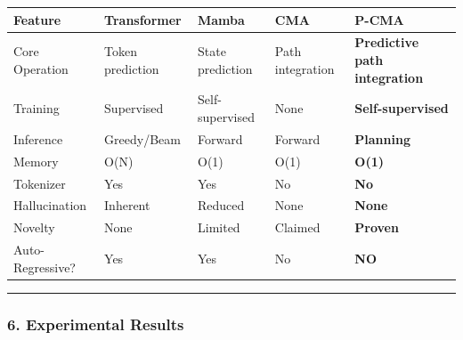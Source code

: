 \documentclass[
  11pt,
  a4paper,
]{article}
\begin{document}
\begin{longtable}[]{@{}
  >{\raggedright\arraybackslash}p{}
  >{\raggedright\arraybackslash}p{}
  >{\raggedright\arraybackslash}p{}
  >{\raggedright\arraybackslash}p{}
  >{\raggedright\arraybackslash}p{}@{}}
\toprule\noalign{}
\begin{minipage}[b]{\linewidth}\raggedright
Feature
\end{minipage} & \begin{minipage}[b]{\linewidth}\raggedright
Transformer
\end{minipage} & \begin{minipage}[b]{\linewidth}\raggedright
Mamba
\end{minipage} & \begin{minipage}[b]{\linewidth}\raggedright
CMA
\end{minipage} & \begin{minipage}[b]{\linewidth}\raggedright
\textbf{P-CMA}
\end{minipage} \\
\midrule\noalign{}
\endhead
\bottomrule\noalign{}
\endlastfoot
Core Operation & Token prediction & State prediction & Path integration
& \textbf{Predictive path integration} \\
Training & Supervised & Self-supervised & None &
\textbf{Self-supervised} \\
Inference & Greedy/Beam & Forward & Forward & \textbf{Planning} \\
Memory & O(N) & O(1) & O(1) & \textbf{O(1)} \\
Tokenizer & Yes & Yes & No & \textbf{No} \\
Hallucination & Inherent & Reduced & None & \textbf{None} \\
Novelty & None & Limited & Claimed & \textbf{Proven} \\
Auto-Regressive? & Yes & Yes & No & \textbf{NO} \\
\end{longtable}

\begin{center}\rule{0.5\linewidth}{0.5pt}\end{center}

\subsubsection{6. Experimental Results}\label{experimental-results}
\end{document}
